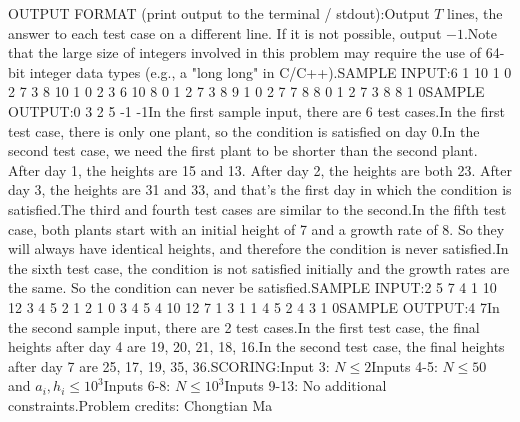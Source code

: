 \documentclass[12pt]{article}
\begin{document}
OUTPUT FORMAT (print output to the terminal / stdout):Output $T$ lines, the answer to each test case on a different line. If it is not
possible, output $-1$.Note that the large size of integers involved in this problem may require the
use of 64-bit integer data types (e.g., a "long long" in C/C++).SAMPLE INPUT:6
1
10
1
0
2
7 3
8 10
1 0
2
3 6
10 8
0 1
2
7 3
8 9
1 0
2
7 7
8 8
0 1
2
7 3
8 8
1 0SAMPLE OUTPUT:0
3
2
5
-1
-1In the first sample input, there are 6 test cases.In the first test case, there is only one plant, so the condition is satisfied
on day 0.In the second test case, we need the first plant to be shorter than the second
plant.  After day 1, the heights are 15 and 13.  After day 2, the heights are
both 23.  After day 3, the heights are 31 and 33, and that's the first day in
which the condition is satisfied.The third and fourth test cases are similar to the second.In the fifth test case, both plants start with an initial height of 7 and a
growth rate of 8.  So they will always have identical heights, and therefore the
condition is never satisfied.In the sixth test case, the condition is not satisfied initially and the growth
rates are the same. So the condition can never be satisfied.SAMPLE INPUT:2
5
7 4 1 10 12
3 4 5 2 1
2 1 0 3 4
5
4 10 12 7 1
3 1 1 4 5
2 4 3 1 0SAMPLE OUTPUT:4
7In the second sample input, there are 2 test cases.In the first test case, the final heights after day 4 are 19, 20, 21, 18, 16.In the second test case, the final heights after day 7 are 25, 17, 19, 35, 36.SCORING:Input 3: $N \le 2$Inputs 4-5: $N \le 50$ and $a_i, h_i \le 10^3$Inputs 6-8: $N \le 10^3$Inputs 9-13: No additional constraints.Problem credits: Chongtian Ma
\end{document}

